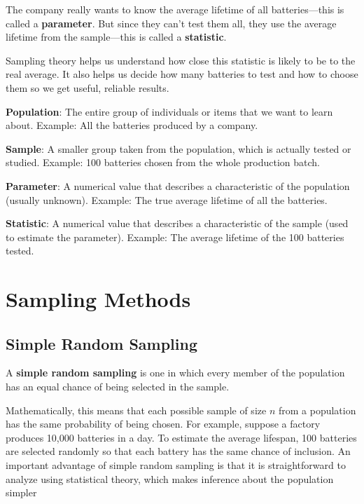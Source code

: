 \documentclass[twoside]{book}
\begin{document}
The company really wants to know the average lifetime of all batteries—this is called a \textbf{parameter}. But since they can’t test them all, they use the average lifetime from the sample—this is called a \textbf{statistic}.

Sampling theory helps us understand how close this statistic is likely to be to the real average. It also helps us decide how many batteries to test and how to choose them so we get useful, reliable results.

\begin{textbox}
    \textbf{Population}: The entire group of individuals or items that we want to learn about.
    Example: All the batteries produced by a company.

    \vspace{3mm}
    \textbf{Sample}: A smaller group taken from the population, which is actually tested or studied.
    Example: 100 batteries chosen from the whole production batch.

    \vspace{3mm}
    \textbf{Parameter}: A numerical value that describes a characteristic of the population (usually unknown).
    Example: The true average lifetime of all the batteries.

    \vspace{3mm}
    \textbf{Statistic}: A numerical value that describes a characteristic of the sample (used to estimate the parameter).
    Example: The average lifetime of the 100 batteries tested.
\end{textbox}

\section{Sampling Methods}

\subsection{Simple Random Sampling}

\begin{textbox}
A \textbf{simple random sampling} is one in which every member of the population has an equal chance of being selected in the sample.
\end{textbox}
 Mathematically, this means that each possible sample of size $n$ from a population has the same probability of being chosen. For example, suppose a factory produces 10,000 batteries in a day. To estimate the average lifespan, 100 batteries are selected randomly so that each battery has the same chance of inclusion. An important advantage of simple random sampling is that it is straightforward to analyze using statistical theory, which makes inference about the population simpler
\end{document}
